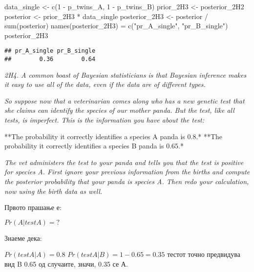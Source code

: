 \documentclass[
]{book}
\newenvironment{Shaded}{\begin{snugshade}}{\end{snugshade}}
\newcommand{\DecValTok}[1]{\textcolor[rgb]{0.00,0.00,0.81}{#1}}
\newcommand{\FunctionTok}[1]{\textcolor[rgb]{0.00,0.00,0.00}{#1}}
\newcommand{\NormalTok}[1]{#1}
\newcommand{\OtherTok}[1]{\textcolor[rgb]{0.56,0.35,0.01}{#1}}
\newcommand{\SpecialCharTok}[1]{\textcolor[rgb]{0.00,0.00,0.00}{#1}}
\newcommand{\StringTok}[1]{\textcolor[rgb]{0.31,0.60,0.02}{#1}}
\begin{document}
\begin{Shaded}
\begin{Highlighting}[]
\NormalTok{data\_single }\OtherTok{\textless{}{-}} \FunctionTok{c}\NormalTok{(}\DecValTok{1} \SpecialCharTok{{-}}\NormalTok{ p\_twins\_A, }\DecValTok{1} \SpecialCharTok{{-}}\NormalTok{ p\_twins\_B)}
\NormalTok{prior\_2H3 }\OtherTok{\textless{}{-}}\NormalTok{ posterior\_2H2}
\NormalTok{posterior }\OtherTok{\textless{}{-}}\NormalTok{ prior\_2H3 }\SpecialCharTok{*}\NormalTok{ data\_single}
\NormalTok{posterior\_2H3 }\OtherTok{\textless{}{-}}\NormalTok{ posterior }\SpecialCharTok{/} \FunctionTok{sum}\NormalTok{(posterior)}
\FunctionTok{names}\NormalTok{(posterior\_2H3) }\OtherTok{=} \FunctionTok{c}\NormalTok{(}\StringTok{"pr\_A\_single"}\NormalTok{, }\StringTok{"pr\_B\_single"}\NormalTok{)}
\NormalTok{posterior\_2H3}
\end{Highlighting}
\end{Shaded}

\begin{verbatim}
## pr_A_single pr_B_single 
##        0.36        0.64
\end{verbatim}

\emph{2H4. A common boast of Bayesian statisticians is that Bayesian inference makes it easy to use all of the data, even if the data are of different types.}

\emph{So suppose now that a veterinarian comes along who has a new genetic test that she claims can identify the species of our mother panda. But the test, like all tests, is imperfect. This is the information you have about the test:}

**The probability it correctly identifies a species A panda is 0.8.*
**The probability it correctly identifies a species B panda is 0.65.*

\emph{The vet administers the test to your panda and tells you that the test is positive for species A. First ignore your previous information from the births and compute the posterior probability that your panda is species A. Then redo your calculation, now using the birth data as well.}

Првото прашање е:

\(Pr(A|testA) = ?\)

Знаеме дека:

\(Pr(testA|A) = 0.8\)
\(Pr(testA|B) = 1 - 0.65 = 0.35\) тестот точно предвидува вид B 0.65 од случаите, значи, 0.35 се А.
\end{document}
